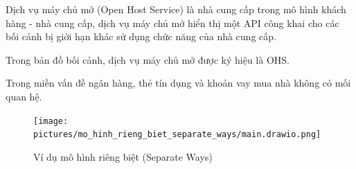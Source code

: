 Dịch vụ máy chủ mở (Open Host Service) là nhà cung cấp trong mô hình khách hàng - nhà cung cấp, dịch vụ máy chủ mở hiển thị một API công khai cho các bối cảnh bị giới hạn khác sử dụng chức năng của nhà cung cấp.

Trong bản đồ bối cảnh, dịch vụ máy chủ mở được ký hiệu là OHS.



















\begin{example} Trong miền vấn đề ngân hàng, thẻ tín dụng và khoản vay mua nhà không có mối quan hệ.

    \begin{figure}[H]

        \centering

        \texttt{[image: pictures/mo\_hinh\_rieng\_biet\_separate\_ways/main.drawio.png]}

        \caption{Ví dụ mô hình riêng biệt (Separate Ways)}

    \end{figure}

\end{example}


